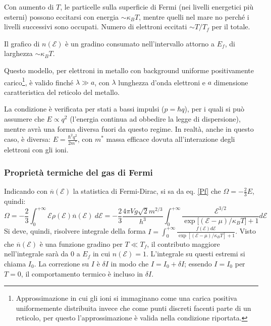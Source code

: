 \documentclass[10pt, a4paper]{scrartcl}
\numberwithin{equation}{subsection}
\theoremstyle{style1}
\begin{document}
Con aumento di $T$, le particelle sulla superficie di Fermi (nei livelli energetici pi\`u esterni) possono eccitarsi con energia $\sim \kappa _B T$, mentre quelli nel mare no perch\'e i livelli successivi sono occupati. 
Numero di elettroni eccitati $\sim T / T_f$ per il totale. 

Il grafico di $n(\mathscr{E})$ \`e un gradino consumato nell'intervallo attorno a $E_f$, di larghezza $\sim \kappa _B T$. 

Questo modello, per elettroni in metallo con background uniforme positivamente carico\footnote{Approssimazione in cui gli ioni si immaginano come una carica positiva uniformemente distribuita invece che come punti discreti facenti parte di un reticolo, per questo l'approssimazione \`e valida nella condizione riportata.}, \`e valido finch\'e $\lambda \gg a$, con $\lambda $ lunghezza d'onda elettroni e $a$ dimensione caratteristica del reticolo del metallo.

La condizione \`e verificata per stati a bassi impulsi ($p = \hbar  q$), per i quali si pu\`o assumere che $E \propto q^2$ (l'energia continua ad obbedire la legge di dispersione), mentre avr\`a una forma diversa fuori da questo regime. 
In realt\`a, anche in questo caso, \`e diversa: $E = \frac{\hbar ^2 q^2}{2m^*}$, con $m^*$ massa efficace dovuta all'interazione degli elettroni con gli ioni.

\subsubsection{Propriet\`a termiche del gas di Fermi}
Indicando con $\overline{n}(\mathscr{E})$ la statistica di Fermi-Dirac, si sa da eq. \ref{Pf} che $\Omega = -\frac{2}{3}E$, quindi:
\[
	\Omega = -\frac{2}{3} \int_{0} ^{+\infty} \mathscr{E}\rho (\mathscr{E}) \overline{n}(\mathscr{E}) \ d \mathscr{E}= -\frac{2}{3} \frac{4 \pi V g \sqrt{2} m^{2 / 3} }{h^3}\int_{0} ^{+\infty} \frac{\mathscr{E}^{3/2} }{\exp \big[(\mathscr{E}-\mu) / \kappa _BT \big] + 1} d \mathscr{E}
\] 
Si deve, quindi, risolvere integrale della forma $I = \int_{0} ^{+\infty} \frac{f(\mathscr{E}) d \mathscr{E}}{\exp\left[ (\mathscr{E}-\mu ) / \kappa _ BT \right] +1}$.
Visto che $\overline{n}(\mathscr{E})$ \`e una funzione gradino per $T \ll T_f$, il contributo maggiore nell'integrale sar\`a da $0$ a $E_f$ in cui $n(\mathscr{E}) = 1$.
L'integrale su questi estremi si chiama $I_0$. La correzione su $I$ \`e $\delta I$ in modo che $I = I_0 + \delta I$; essendo $I = I_0$ per $T=0$, il comportamento termico \`e incluso in $\delta I$.
\end{document}
